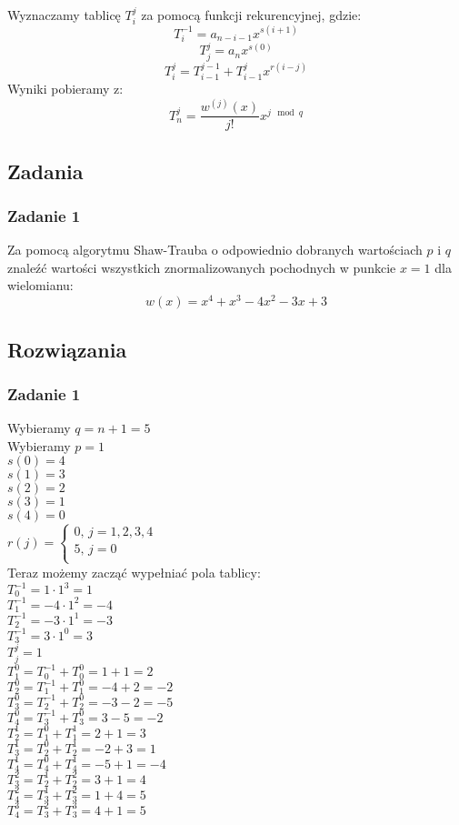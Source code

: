 \documentclass[a4paper]{article}
\begin{document}
Wyznaczamy tablicę $T^j_i$ za pomocą funkcji rekurencyjnej, gdzie:
$$ T^{-1}_i = a_{n-i-1}x^{s(i+1)} $$
$$ T^j_j = a_nx^{s(0)} $$
$$ T^j_i = T^{j-1}_{i-1}+T^j_{i-1}x^{r(i-j)} $$
Wyniki pobieramy z:
$$ T^j_n = \frac{w^{(j)}(x)}{j!}x^{j \mod q} $$


\subsection{Zadania}
\subsubsection*{Zadanie 1}
Za pomocą algorytmu Shaw-Trauba o odpowiednio dobranych wartościach $p$ i $q$ znaleźć wartości wszystkich znormalizowanych pochodnych w punkcie $x=1$ dla wielomianu:
$$w(x)=x^4+x^3-4x^2-3x+3$$

\subsection{Rozwiązania}
\subsubsection*{Zadanie 1}
Wybieramy $q = n+1 = 5$\\
Wybieramy $p = 1$\\
$s(0)=4$\\
$s(1)=3$\\
$s(2)=2$\\
$s(3)=1$\\
$s(4)=0$\\
$r(j) = \begin{cases} 0\text{,\ \ } j=1,2,3,4\\5\text{,\ \ }j=0\\\end{cases}$\\
Teraz możemy zacząć wypełniać pola tablicy:\\
$T^{-1}_0 = 1\cdot 1^3 = 1 $ \\
$T^{-1}_1 = -4\cdot 1^2 = -4 $\\
$T^{-1}_2 = -3\cdot 1^1 = -3 $\\
$T^{-1}_3 = 3 \cdot 1^0 = 3 $\\
$T^j_j = 1$\\ 
$T^0_1 = T^{-1}_0+T^0_0 = 1+1 = 2$\\
$T^0_2 = T^{-1}_1+T^0_1 = -4+2 = -2$\\
$T^0_3 = T^{-1}_2+T^0_2 = -3-2 = -5$\\
$T^0_4 = T^{-1}_3+T^0_3 = 3-5 = -2$\\
$T^1_2 = T^0_1+T^1_1 = 2 + 1 = 3$\\
$T^1_3 = T^0_2+T^1_2 = -2 + 3 = 1$\\
$T^1_4 = T^0_4+T^1_4 = -5 + 1 = -4$\\
$T^2_3 = T^1_2+T^2_2 = 3 + 1 = 4$\\
$T^2_4 = T^1_3+T^2_3 = 1 + 4 = 5$\\
$T^3_4 = T^2_3+T^3_3 = 4 + 1 = 5$\\
\end{document}
